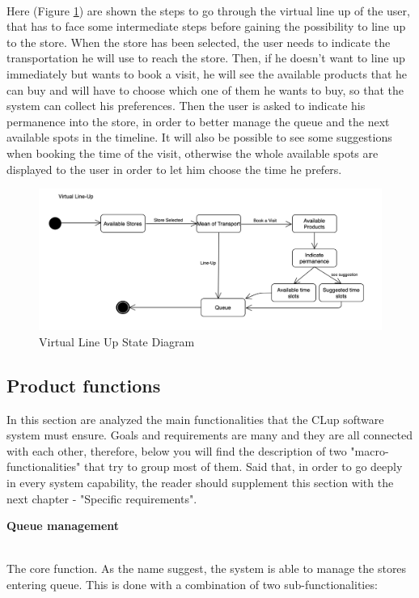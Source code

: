 \documentclass[]{article}
\begin{document}
		
		
		
		\textbf{}\\ \newline
		
		Here (Figure \ref{fig:state_diagram3})  are shown the steps to go through the virtual line up of the user, that has to face some intermediate steps before gaining the possibility to line up to the store. When the store has been selected, the user needs to indicate the transportation he will use to reach the store. Then, if he doesn't want to line up immediately but wants to book a visit, he will see the available products that he can buy and will have to choose which one of them he wants to buy, so that the system can collect his preferences. Then the user is asked to indicate his permanence into the store, in order to better manage the queue and the next available spots in the timeline. It will also be possible to see some suggestions when booking the time of the visit, otherwise the whole available spots are displayed to the user in order to let him choose the time he prefers.
		\medskip
		\begin{figure}[H]
			\centering
			\includegraphics[width=\linewidth]{VirtualLineUp_statediagram.png}
			\caption{Virtual Line Up State Diagram}
			\label{fig:state_diagram3}
		\end{figure}
		
		
		

\newpage

\subsection{Product functions}

In this section are analyzed the main functionalities that the CLup software system must ensure. Goals and requirements are many and they are all connected with each other, therefore, below you will find the description of two "macro-functionalities" that try to group most of them. Said that, in order to go deeply in every system capability, the reader should supplement this section with the next chapter - "Specific requirements".
\bigskip
\\
\begin{large}
	\textbf{Queue management}
\end{large}
\smallskip
\\
The core function. As the name suggest, the system is able to manage the stores entering queue. This is done with a combination of two sub-functionalities: 
\end{document}
